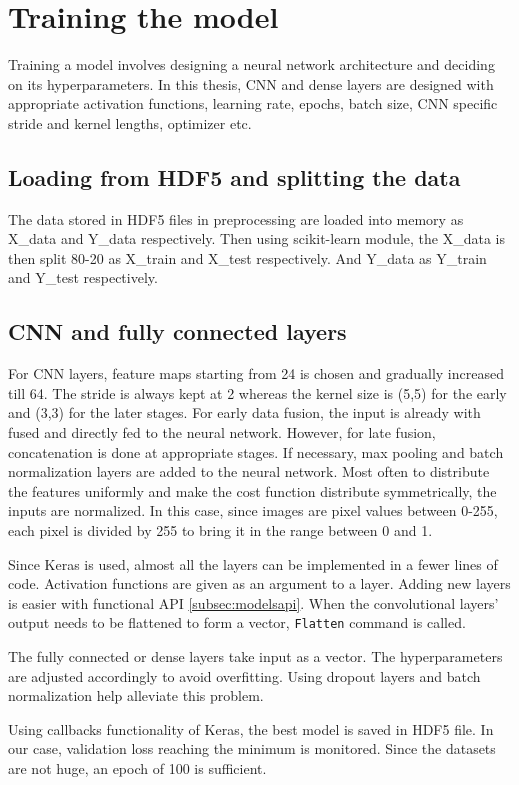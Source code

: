 \section{Training the model}
Training a model involves designing a neural network architecture and deciding on its
hyperparameters. In this thesis, CNN and dense layers are designed with appropriate
activation functions, learning rate, epochs, batch size, CNN specific stride and kernel
lengths, optimizer etc.

\subsection{Loading from HDF5 and splitting the data}
The data stored in HDF5 files in preprocessing are loaded into memory as X\_data and
Y\_data respectively. Then using scikit-learn module, the X\_data is then split 80-20
as X\_train and X\_test respectively. And Y\_data as Y\_train and Y\_test respectively.

\subsection{CNN and fully connected layers}
For CNN layers, feature maps starting from 24 is chosen and gradually increased till 64.
The stride is always kept at 2 whereas the kernel size is (5,5) for the early and
(3,3) for the later stages. For early data fusion, the input is already with fused and directly
fed to the neural network. However, for late fusion, concatenation is done at appropriate
stages. If necessary, max pooling and batch normalization layers are added to the neural
network. Most often to distribute the features uniformly and make the cost function
distribute symmetrically, the inputs are normalized. In this case, since images are pixel
values between 0-255, each pixel is divided by 255 to bring it in the range between 0 and
1.

Since Keras is used, almost all the layers can be implemented in a fewer lines of code.
Activation functions are given as an argument to a layer. Adding new layers is easier with
functional API \ref{subsec:modelsapi}. When the convolutional layers' output needs to be
flattened to form a vector, \texttt{Flatten} command is called.

The fully connected or dense layers take input as a vector. The hyperparameters are
adjusted accordingly to avoid overfitting. Using dropout layers and batch normalization
help alleviate this problem.

Using callbacks functionality of Keras, the best model is saved in HDF5 file. In our case, validation
loss  reaching the minimum is monitored. Since the datasets are not huge, an epoch of 100
is sufficient.

